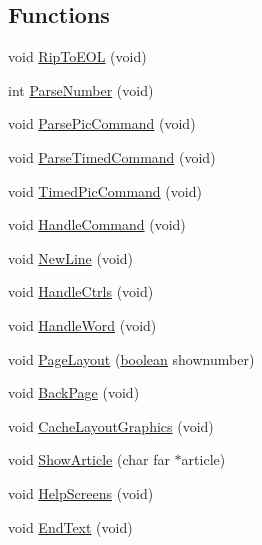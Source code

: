 \subsection*{Functions}
\begin{DoxyCompactItemize}
\item 
void \hyperlink{WL__TEXT_8C_a4ce1d6ef4ea4445f18f5d7c2dcce817e}{RipToEOL} (void)
\item 
int \hyperlink{WL__TEXT_8C_a2cb5d5c64873238c927112cfa403455a}{ParseNumber} (void)
\item 
void \hyperlink{WL__TEXT_8C_a54fc6ee9755689f998d8e81754867234}{ParsePicCommand} (void)
\item 
void \hyperlink{WL__TEXT_8C_ab37df8a0a1c922da15b4ed950eaa3f0d}{ParseTimedCommand} (void)
\item 
void \hyperlink{WL__TEXT_8C_abbecf5fd92e248b4fe47a58f359af86b}{TimedPicCommand} (void)
\item 
void \hyperlink{WL__TEXT_8C_afeea8bf562580ae8e7253ce5aa13dc80}{HandleCommand} (void)
\item 
void \hyperlink{WL__TEXT_8C_a453cb4123eb9c983999067d525dc5fe8}{NewLine} (void)
\item 
void \hyperlink{WL__TEXT_8C_a2b9c23c846067c4729e5d5ff74e681f9}{HandleCtrls} (void)
\item 
void \hyperlink{WL__TEXT_8C_ae12bb704b23473d941dd7d0826ca1aba}{HandleWord} (void)
\item 
void \hyperlink{WL__TEXT_8C_a3224c47d778c20c9616a4483f48b0ee6}{PageLayout} (\hyperlink{ID__HEAD_8H_a7c6368b321bd9acd0149b030bb8275ed}{boolean} shownumber)
\item 
void \hyperlink{WL__TEXT_8C_a5fb67f5c480e8bb2b99eb0b46fc840f3}{BackPage} (void)
\item 
void \hyperlink{WL__TEXT_8C_a646557f2e9c30f23c90632bcdfc8caa2}{CacheLayoutGraphics} (void)
\item 
void \hyperlink{WL__TEXT_8C_ab5697774e1a05a1e3e51b02688f1561f}{ShowArticle} (char far $\ast$article)
\item 
void \hyperlink{WL__TEXT_8C_a7dfe666305b63dcb0a03ee9960b74d01}{HelpScreens} (void)
\item 
void \hyperlink{WL__TEXT_8C_a11ef38288d701a8921caf515d527cd58}{EndText} (void)
\end{DoxyCompactItemize}
